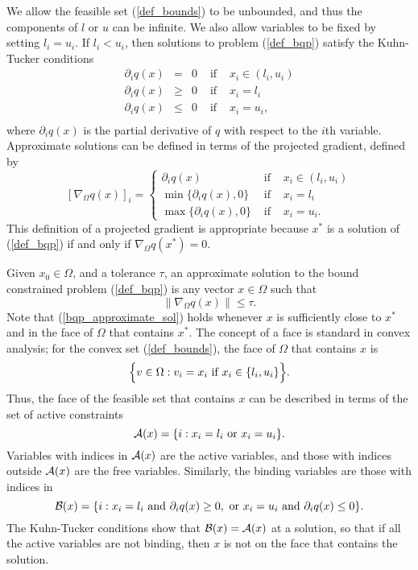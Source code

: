 \documentclass{esub2acm}
\newcommand{\Ref}[1]{\mbox{\rm{(\ref{#1})}}}
\newcommand{\grad}{\nabla}
\newcommand{\cA} {\mbox{$\cal A$}}
\newcommand{\cB} {\mbox{$\cal B$}}
\begin{document}
We allow the feasible set \Ref{def_bounds} to be unbounded,
and thus the components of $l$ or $u$ can be infinite.
We also allow variables to be fixed by setting $ l_i = u_i $.
If $ l_i < u_i $, then  solutions to problem \Ref{def_bqp} 
satisfy the Kuhn-Tucker conditions
\[ \begin{array}{lllll}
\partial_iq(x) & = & 0 & \mbox{ if } & x_i \in (l_i, u_i) \\
\partial_iq(x) & \geq & 0 & \mbox{ if } & x_i = l_i \\
\partial_iq(x) & \leq & 0 & \mbox{ if } & x_i = u_i , \\
\end{array}
\]
where $\partial_iq(x)$ is the partial derivative of $q$ with
respect to the $i$th variable.
Approximate solutions can be defined in terms of the projected
gradient, defined by
\begin{equation} \label{proj-gradient}
 \left[ \nabla _{\Omega} q(x) \right] _i = \left\{
\begin{array}{lll}
\partial_i q(x) & \mbox{ if } & x_i \in (l_i, u_i) \\
\min \{ \partial_i q(x),0 \} & \mbox{ if } & x_i = l_i \\
\max \{ \partial_i q(x),0 \} & \mbox{ if } & x_i = u_i .
\end{array}
\right.
\end{equation}
This definition of a projected gradient is appropriate 
because $x^*$ is a solution of (\ref{def_bqp}) if and only if
$\nabla_{\Omega} q(x^*)=0$.

Given $x_0 \in \Omega$, and a tolerance $\tau$, an
approximate solution to the bound constrained problem (\ref{def_bqp}) 
is any vector $x \in \Omega$ such
that
\begin{equation} 
\label{bqp_approximate_sol}
\| \nabla_{\Omega} q(x) \| \leq \tau . %
\end{equation}
Note that (\ref{bqp_approximate_sol}) holds whenever
$x$ is sufficiently close to $x^*$ and in the face of $\Omega $ that
contains $x^*$.  The concept of a face is standard in convex analysis;
for the convex set (\ref{def_bounds}), the face of $\Omega$ that contains
$x$ is
\[ 
\Bigl \{ v \in \Omega: v_i = x_i \mbox{ if } x_i \in \{ l_i, u_i \} \Bigr \}. 
\]
Thus, the face of the feasible set that contains $x$ can
be described in terms of the set of active constraints
\[ 
{\cal A}(x) = \{ i: x_i = l_i \mbox{ or } x_i = u_i \}. 
\]
Variables with indices in ${\cal A}(x)$ are the active variables,
and those with indices outside  ${\cal A}(x)$ are the free variables.
Similarly, the binding variables are those with indices in
\[ 
{\cal B}(x) = \{ i:x_i=l_i \mbox{ and } \partial_iq(x) \geq 0,
\mbox{ or } x_i=u_i \mbox{ and } \partial_iq(x) \leq 0 \}. 
\]
The Kuhn-Tucker conditions show that 
$ \cB (x) = \cA (x) $ at a solution, so that if all the active
variables are not binding, then $x$ is not on the face
that contains the solution.
\end{document}
